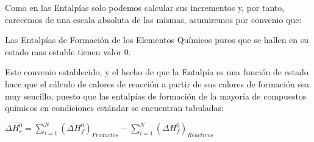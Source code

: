 Como en las Entalpías solo podemos calcular sus incrementos y, por tanto, carecemos de una escala absoluta de las mismas, asumiremos por convenio que:\\

\begin{definition}
Las Entalpías de Formación de los Elementos Químicos puros que se hallen en su estado mas estable tienen valor 0.
\end{definition}

Este convenio establecido, y el hecho de que la Entalpía es una función de estado hace que el cálculo de calores de reacción a partir de sus calores de formación sea muy sencillo, puesto que las entalpías de formación de la mayoría de compuestos químicos en condiciones estándar se encuentran tabuladas:

\begin{center}
	$\Delta H^{0}_r = \displaystyle\sum_{i = 1}^{N}(\Delta H^{0}_f)_{Productos} - \displaystyle\sum_{i=1}^{N}(\Delta H^{0}_f)_{Reactivos}$
\end{center}











